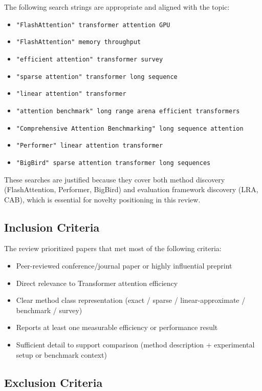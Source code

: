 \documentclass[12pt, a4paper]{article}
\begin{document}
The following search strings are appropriate and aligned with the topic:
\begin{itemize}
    \item \texttt{"FlashAttention" transformer attention GPU}
    \item \texttt{"FlashAttention" memory throughput}
    \item \texttt{"efficient attention" transformer survey}
    \item \texttt{"sparse attention" transformer long sequence}
    \item \texttt{"linear attention" transformer}
    \item \texttt{"attention benchmark" long range arena efficient transformers}
    \item \texttt{"Comprehensive Attention Benchmarking" long sequence attention}
    \item \texttt{"Performer" linear attention transformer}
    \item \texttt{"BigBird" sparse attention transformer long sequences}
\end{itemize}

These searches are justified because they cover both method discovery (FlashAttention, Performer, BigBird) and evaluation framework discovery (LRA, CAB), which is essential for novelty positioning in this review.

\subsection{Inclusion Criteria}

The review prioritized papers that met most of the following criteria:
\begin{itemize}
    \item Peer-reviewed conference/journal paper or highly influential preprint
    \item Direct relevance to Transformer attention efficiency
    \item Clear method class representation (exact / sparse / linear-approximate / benchmark / survey)
    \item Reports at least one measurable efficiency or performance result
    \item Sufficient detail to support comparison (method description + experimental setup or benchmark context)
\end{itemize}

\subsection{Exclusion Criteria}
\end{document}
